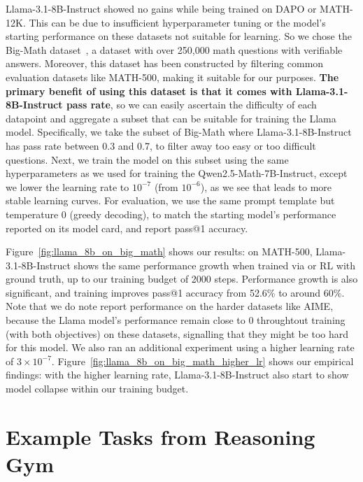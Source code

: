 Llama-3.1-8B-Instruct showed no gains while being trained on DAPO or MATH-12K. This can be due to insufficient hyperparameter tuning or the model's starting performance on these datasets not suitable for learning. So we chose the Big-Math dataset~\citep{albalak2025bigmathlargescalehighqualitymath}, a dataset with over 250,000 math questions with verifiable answers. Moreover, this dataset has been constructed by filtering common evaluation datasets like MATH-500, making it suitable for our purposes. \textbf{The primary benefit of using this dataset is that it comes with Llama-3.1-8B-Instruct pass rate}, so we can easily ascertain the difficulty of each datapoint and aggregate a subset that can be suitable for training the Llama model. Specifically, we take the subset of Big-Math where Llama-3.1-8B-Instruct has pass rate between 0.3 and 0.7, to filter away too easy or too difficult questions. Next, we train the model on this subset using the same hyperparameters as we used for training the Qwen2.5-Math-7B-Instruct, except we lower the learning rate to $10^{-7}$ (from $10^{-6}$), as we see that leads to more stable learning curves. For evaluation, we use the same prompt template but temperature 0 (greedy decoding), to match the starting model's performance reported on its model card, and report pass@1 accuracy.

Figure~\ref{fig:llama_8b_on_big_math} shows our results: on MATH-500, Llama-3.1-8B-Instruct shows the same performance growth when trained via \algo{} or RL with ground truth, up to our training budget of 2000 steps. Performance growth is also significant, and training improves pass@1 accuracy from 52.6\% to around 60\%. Note that we do note report performance on the harder datasets like AIME, because the Llama model's performance remain close to 0 throughtout training (with both objectives) on these datasets, signalling that they might be too hard for this model. We also ran an additional experiment using a higher learning rate of $3 \times 10^{-7}$. Figure~\ref{fig:llama_8b_on_big_math_higher_lr} shows our empirical findings: with the higher learning rate, Llama-3.1-8B-Instruct also start to show model collapse within our training budget.

\newpage

\section{Example Tasks from Reasoning Gym} \label{app:reasoning_gym_example_tasks}


